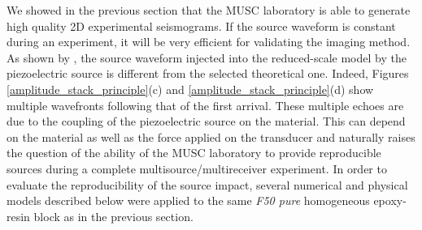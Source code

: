\documentclass[paper,extra]{gji} %
\begin{document}
\noindent We showed in the previous section that the MUSC laboratory is able to generate high quality 2D experimental seismograms. If the source waveform is constant during an experiment, it will be very efficient for validating the imaging method. As shown by \citet{Bretaudeau_SSM_2011}, the source waveform injected into the reduced-scale model by the piezoelectric source is different from the selected theoretical one. Indeed, Figures \ref{amplitude_stack_principle}(c) and \ref{amplitude_stack_principle}(d) show multiple wavefronts following that of the first arrival. These multiple echoes are due to the coupling of the piezoelectric source on the material. This can depend on the material as well as the force applied on the transducer and naturally raises the question of the ability of the MUSC laboratory to provide reproducible sources during a complete multisource/multireceiver experiment. In order to evaluate the reproducibility of the source impact, several numerical and physical models described below were applied to the same \textit{F50 pure} homogeneous epoxy-resin block as in the previous section.
\end{document}
